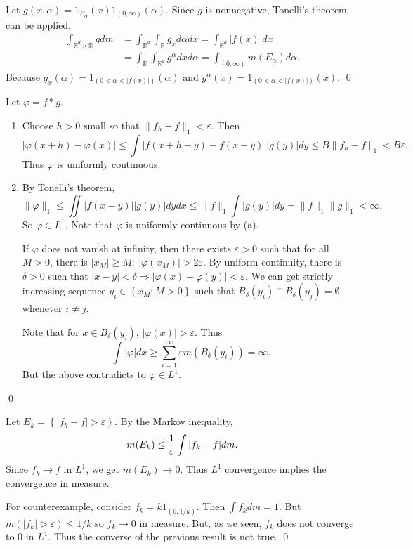 \begin{exercise}[2.19] \hfill

	Let $g(x, \alpha) = 1_{E_\alpha}(x) 1_{\left( 0, \infty \right)}(\alpha)$.
	Since $g$ is nonnegative, Tonelli's theorem can be applied.
	\[
		\begin{split}
			\int_{\mathbb{R}^d \times \mathbb{R}} gdm
			&= \int_{\mathbb{R}^d}\int_{\mathbb{R}}g_x d\alpha dx = \int_{\mathbb{R}^d}|f(x)|dx \\
			&= \int_\mathbb{R}\int_{\mathbb{R}^d} g^\alpha dxd\alpha = \int_{\left( 0, \infty \right)}m(E_\alpha) d\alpha.
		\end{split}
	\]
	Because $g_x(\alpha) = 1_{\left( 0 < \alpha < |f(x)| \right)}(\alpha)$
	and $g^\alpha(x) = 1_{\left( 0 < \alpha < |f(x)| \right)}(x).$
	\qed
\end{exercise}

\begin{exercise}[2.24] \hfill

	Let $\varphi = f*g.$
	\begin{enumerate}[label = (\alph*)]
		\item Choose $h>0$ small so that $\| f_h - f\|_1 < \varepsilon$.
			Then
			\[
				|\varphi(x+h) - \varphi(x)|
				\le \int |f(x+h-y) - f(x-y)| |g(y)| dy
				\le B \|f_h -f \|_1 < B\varepsilon.
			\]
			Thus $\varphi$ is uniformly continuous.

		\item By Tonelli's theorem,
			\[
				\| \varphi \|_1
				\le \iint |f(x-y)||g(y)|dydx
				\le \|f\|_1 \int |g(y)| dy
				= \|f\|_1 \|g\|_1 < \infty.
			\]
			So $\varphi \in L^1$.
			Note that $\varphi$ is uniformly continuous by (a).

			If $\varphi$ does not vanish at infinity, then there exists $\varepsilon>0$ such that
			for all $M>0$, there is $|x_M| \ge M:\ |\varphi(x_M)| > 2\varepsilon$.
			By uniform continuity, there is $\delta>0$ such that $|x-y|<\delta \Rightarrow |\varphi(x) - \varphi(y)| < \varepsilon$.
			We can get strictly increasing sequence $y_i \in \left\{ x_M: M>0 \right\}$ such that $B_\delta(y_i) \cap B_\delta(y_j) = \emptyset$ whenever $i \ne j$.

			Note that for $x \in B_\delta(y_i)$, $|\varphi(x)| > \varepsilon.$
			Thus
			\[
				\int |\varphi| dx \ge \sum_{i=1}^\infty \varepsilon m(B_\delta(y_i)) = \infty.
			\]
			But the above contradicts to $\varphi \in L^1.$
	\end{enumerate}
	\qed
\end{exercise}

\begin{problem}[2.3] \hfill
	
	Let $E_k = \left\{ |f_k - f| > \varepsilon \right\}.$
	By the Markov inequality,
	\[
		m(E_k) \le {1 \over \varepsilon} \int |f_k - f| dm.
	\]
	Since $f_k \rightarrow f$ in $L^1$, we get $m(E_k) \rightarrow 0$.
	Thus $L^1$ convergence implies the convergence in measure.

	For counterexample, consider $f_k = k 1_{\left( 0, 1/k \right)}$.
	Then $\int f_k dm = 1$.
	But $m(|f_k|>\varepsilon) \leq 1/k$ so $f_k \rightarrow 0$ in measure.
	But, as we seen, $f_k$ does not converge to $0$ in $L^1$.
	Thus the converse of the previous result is not true.
	\qed
\end{problem}
